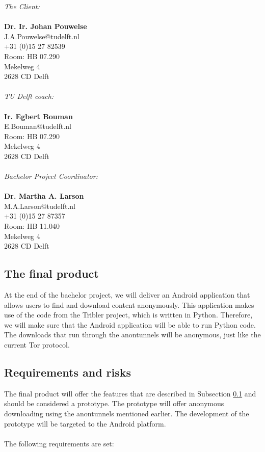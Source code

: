 \emph{The Client:}\\\\
\textbf{Dr. Ir. Johan Pouwelse}\\
J.A.Pouwelse@tudelft.nl\\
+31 (0)15 27 82539\\
Room: HB 07.290\\
Mekelweg 4\\
2628 CD Delft\\\\

\noindent\emph{TU Delft coach:}\\\\
\textbf{Ir. Egbert Bouman}\\
E.Bouman@tudelft.nl\\ 
Room: HB 07.290\\
Mekelweg 4\\
2628 CD Delft\\\\

\noindent\emph{Bachelor Project Coordinator:}\\\\
\textbf{Dr. Martha A. Larson}\\
M.A.Larson@tudelft.nl\\
+31 (0)15 27 87357\\
Room: HB 11.040\\
Mekelweg 4\\
2628 CD Delft\\

\subsection{The final product}
\label{ssec:final-product}
At the end of the bachelor project, we will deliver an Android application that allows users to find and download content anonymously. This application makes use of the code from the Tribler project, which is written in Python. Therefore, we will make sure that the Android application will be able to run Python code.\\
The downloads that run through the anontunnels will be anonymous, just like the current Tor protocol.

\subsection{Requirements and risks}
The final product will offer the features that are described in Subsection \ref{ssec:final-product} and should be considered a prototype. The prototype will offer anonymous downloading using the anontunnels mentioned earlier. The development of the prototype will be targeted to the Android platform.\\\\
The following requirements are set:

